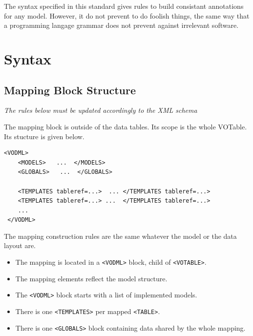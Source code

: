 \documentclass[11pt,a4paper]{ivoa}
\begin{document}
The syntax specified in this standard gives rules to build consistant annotations for any model. However, it do not prevent to do foolish things, the same way that a programming langage grammar does not prevent against irrelevant software.





\section{Syntax}

\subsection{Mapping Block Structure}

\textit{The rules below must be updated accordingly to the XML schema}

The mapping block is outside of the data tables. Its scope is the whole VOTable. Its stucture is given below.

\begin{lstlisting}[caption={INSTANCE bloc example},captionpos=b]
 <VODML>
    <MODELS>   ...  </MODELS>
    <GLOBALS>   ...  </GLOBALS>

    <TEMPLATES tableref=...>  ... </TEMPLATES tableref=...>
    <TEMPLATES tableref=...> ...  </TEMPLATES tableref=...>
    ...
 </VODML>
\end{lstlisting}

The mapping construction rules are the same whatever the model or the data layout are.

\begin{itemize}
    \item The mapping is located in a \texttt{<VODML>} block, child of \texttt{<VOTABLE>}.
    \item The mapping elements reflect the model structure.
    \item The \texttt{<VODML>} block starts with a list of implemented models.
    \item There is one \texttt{<TEMPLATES>} per mapped \texttt{<TABLE>}.
    \item There is one \texttt{<GLOBALS>} block containing data shared by the whole mapping.
\end{itemize}
\end{document}
